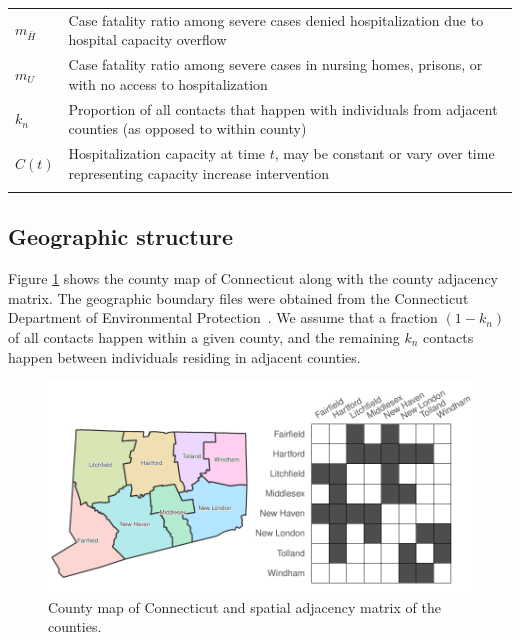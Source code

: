 \documentclass[11pt]{article}
\newcommand{\comments}[1]{[\textcolor{red}{#1}]}
\begin{document}
\begin{spacing}{0.9}
\begin{longtable}[H] {p{} p{} }
	$m_{\bar{H}}$ & Case fatality ratio among severe cases denied hospitalization due to hospital capacity overflow \\[0.5em]
	$m_{U}$ & Case fatality ratio among severe cases in nursing homes, prisons, or with no access to hospitalization \\[0.5em]
	$k_n$ & Proportion of all contacts that happen with individuals from adjacent counties (as opposed to within county) \\[0.5em]
	$C(t)$ & Hospitalization capacity at time $t$, may be constant or vary over time representing capacity increase intervention\\
	\hline
	\label{table:params}
\end{longtable}
\end{spacing}



\subsection{Geographic structure}

Figure \ref{fig:map} shows the county map of Connecticut along with the county adjacency matrix. The geographic boundary files were obtained from the Connecticut Department of Environmental Protection~\citep{shapefile}. We assume that a fraction $(1-k_n)$ of all contacts happen within a given county, and the remaining $k_n$ contacts happen between individuals residing in adjacent counties.

\begin{figure}[htb]
	\centering
	\includegraphics[width=.7\textwidth]{figures/map_adj.pdf}
	\caption{County map of Connecticut and spatial adjacency matrix of the counties.}
	\label{fig:map}
\end{figure}


\end{document}
